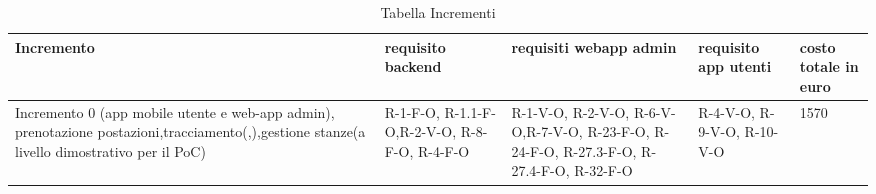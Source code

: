 \hypertarget{TabellaIncrementi}{}
\begin{longtable}{ C{0.15\textwidth} C{0.15\textwidth} C{0.15\textwidth} C{0.15\textwidth} C{0.15\textwidth} }
    \caption{Tabella Incrementi}                                                                                 \\
    \rowcolor{\primaryColor}
    \textcolor{\secondaryColor}{\textbf{Incremento}} & \textcolor{\secondaryColor}{\textbf{requisito backend}}  &\textcolor{\secondaryColor}{\textbf{requisiti webapp admin}}&\textcolor{\secondaryColor}{\textbf{requisito app utenti}}&\textcolor{\secondaryColor}{\textbf{costo totale in euro}}\\ \endhead
    {Incremento 0 (app mobile utente e web-app admin), prenotazione postazioni,tracciamento(,),gestione stanze(a livello dimostrativo per il PoC)} & {R-1-F-O, R-1.1-F-O,R-2-V-O, R-8-F-O, R-4-F-O} & {R-1-V-O, R-2-V-O, R-6-V-O,R-7-V-O, R-23-F-O, R-24-F-O, R-27.3-F-O, R-27.4-F-O, R-32-F-O} & {R-4-V-O, R-9-V-O, R-10-V-O}&  {1570}\\
    
    

\end{longtable}
